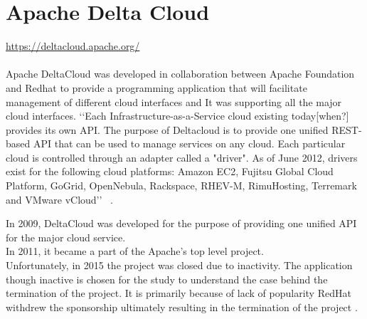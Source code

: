 \section{Apache Delta Cloud}
\url{ https://deltacloud.apache.org/ } \\
\\
Apache DeltaCloud was developed in collaboration between Apache Foundation and Redhat
to provide a programming application that will 
facilitate management of different cloud interfaces and
It was supporting all the major cloud interfaces. 
‘‘Each Infrastructure-as-a-Service cloud existing today[when?] provides
its own API. The purpose of Deltacloud is to provide one unified 
REST-based API that can be used to manage services on any cloud. Each particular 
cloud is controlled through an adapter called a "driver". As of June 2012, drivers 
exist for the following cloud platforms: Amazon EC2, Fujitsu Global Cloud Platform, 
GoGrid, OpenNebula, Rackspace, RHEV-M, RimuHosting, Terremark and VMware vCloud’’ 
~\cite{hid-sp18-417-wiki-deltacloud}.

In 2009, DeltaCloud was developed for the purpose of providing one unified 
API for the major cloud service. \\
In 2011, it became a part of the Apache’s top level project. \\ Unfortunately,
in 2015 the project was closed due to inactivity. 
The application though inactive is chosen for the study to understand 
the case behind the termination of the project. 
It is primarily because of lack of popularity RedHat withdrew the 
sponsorship ultimately resulting in the 
termination of the project .

